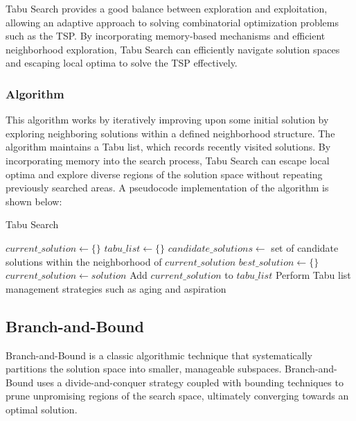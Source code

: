 \documentclass{article}
\begin{document}
\noindent Tabu Search provides a good balance between exploration and exploitation, allowing an adaptive approach to solving combinatorial optimization problems such as the TSP. By incorporating memory-based mechanisms and efficient neighborhood exploration, Tabu Search can efficiently navigate solution spaces and escaping local optima to solve the TSP effectively. 


\subsubsection{Algorithm}
This algorithm works by iteratively improving upon some initial solution by exploring neighboring solutions within a defined neighborhood structure. The algorithm maintains a Tabu list, which records recently visited solutions. By incorporating memory into the search process, Tabu Search can escape local optima and explore diverse regions of the solution space without repeating previously searched areas. A pseudocode implementation of the algorithm is shown below:

\begin{algorithm}[!h]
    \DontPrintSemicolon
    \caption{Tabu Search}
    \label{alg:tabu}

    $current\_solution \gets \{\}$\;
    $tabu\_list \gets \{\}$\;
    {
        $candidate\_solutions \gets$ set of candidate solutions within the neighborhood of $current\_solution$\;
        $best\_solution\gets\{\}$\;
        {
            {
                $current\_solution \gets solution$\;
            }
        }
        Add $current\_solution$ to $tabu\_list$\;
        Perform Tabu list management strategies such as aging and aspiration\;
    }
\end{algorithm}
\newpage


\subsection{Branch-and-Bound}
Branch-and-Bound is a classic algorithmic technique that systematically partitions the solution space into smaller, manageable subspaces. Branch-and-Bound uses a divide-and-conquer strategy coupled with bounding techniques to prune unpromising regions of the search space, ultimately converging towards an optimal solution.
\end{document}
